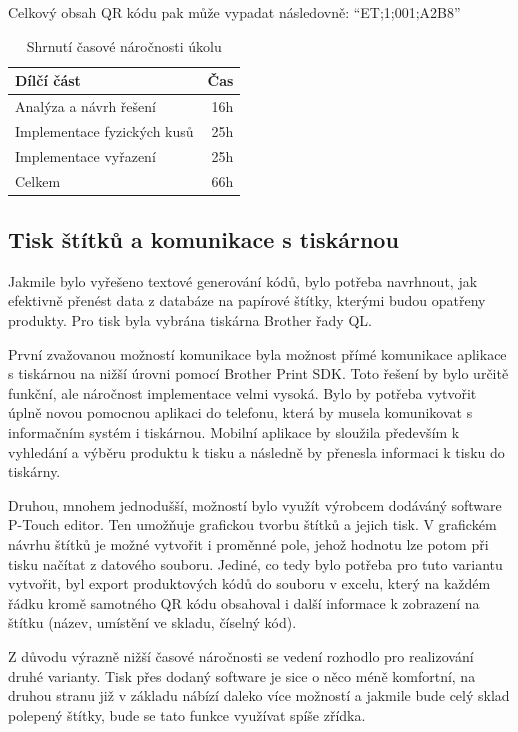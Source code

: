 Celkový obsah QR kódu pak může vypadat následovně: \enquote{ET;1;001;A2B8}


\begin{table}
	\centering
	\caption[Časová náročnost úkolu na evidenci fyzických kusů na skladě]{Shrnutí časové náročnosti úkolu}
	\label{tab:TopLevelTableLabel}
	{
		\begin{tabular}{lr}
			\toprule
			Dílčí část & Čas\\
			\midrule
			Analýza a návrh řešení & 16h \\
			Implementace fyzických kusů & 25h \\
            Implementace vyřazení & 25h \\
            \midrule
            Celkem  & 66h \\
			\midrule
		\end{tabular}
	}
\end{table}

\subsection{Tisk štítků a komunikace s tiskárnou}

Jakmile bylo vyřešeno textové generování kódů, bylo potřeba navrhnout, jak efektivně přenést data z databáze na papírové štítky, kterými budou opatřeny produkty. Pro tisk byla vybrána tiskárna Brother řady QL. 

První zvažovanou možností komunikace byla možnost přímé komunikace aplikace s tiskárnou na nižší úrovni pomocí Brother Print SDK. \cite{brotherInformationLabel} Toto řešení by bylo určitě funkční, ale náročnost implementace velmi vysoká. Bylo by potřeba vytvořit úplně novou pomocnou aplikaci do telefonu, která by musela komunikovat s informačním systém i tiskárnou. Mobilní aplikace by sloužila především k vyhledání a výběru produktu k tisku a následně by přenesla informaci k tisku do tiskárny.

Druhou, mnohem jednodušší, možností bylo využít výrobcem dodáváný software P-Touch editor. Ten umožňuje grafickou tvorbu štítků a jejich tisk. V grafickém návrhu štítků je možné vytvořit i proměnné pole, jehož hodnotu lze potom při tisku načítat z datového souboru.
Jediné, co tedy bylo potřeba pro tuto variantu vytvořit, byl export produktových kódů do souboru v excelu, který na každém řádku kromě samotného QR kódu obsahoval i další informace k zobrazení na štítku (název, umístění ve skladu, číselný kód).

Z důvodu výrazně nižší časové náročnosti se vedení rozhodlo pro realizování druhé varianty. Tisk přes dodaný software je sice o něco méně komfortní, na druhou stranu již v základu nábízí daleko více možností a jakmile bude celý sklad polepený štítky, bude se tato funkce využívat spíše zřídka. 

